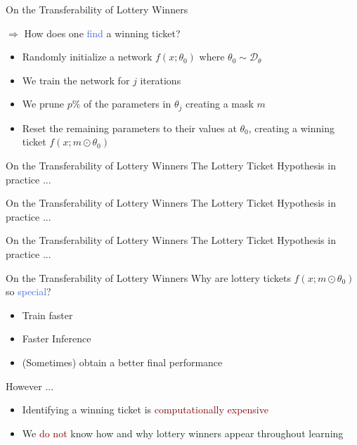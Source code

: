 \documentclass{beamer}
\begin{document}
\begin{frame}{On the Transferability of Lottery Winners}

	$\Rightarrow$ How does one \textcolor{RoyalBlue}{find} a winning ticket?
	
	\begin{itemize}
		\item Randomly initialize a network $f(x;\theta_0)$ where $\theta_0 \sim \mathcal{D}_{\theta}$
		\item We train the network for $j$ iterations
		\item We prune $p\%$ of the parameters in $\theta_j$ creating a mask $m$
		\item Reset the remaining parameters to their values at $\theta_0$, creating a winning ticket $f(x;m \odot \theta_0)$
	\end{itemize}

\end{frame}


\begin{frame}{On the Transferability of Lottery Winners}
	The Lottery Ticket Hypothesis in practice ...

	
\end{frame}

\begin{frame}{On the Transferability of Lottery Winners}
	The Lottery Ticket Hypothesis in practice ...

	
\end{frame}



\begin{frame}{On the Transferability of Lottery Winners}
	The Lottery Ticket Hypothesis in practice ...

	
\end{frame}

\begin{frame}{On the Transferability of Lottery Winners}
	Why are lottery tickets $f(x;m \odot \theta_0)$ so \textcolor{RoyalBlue}{special}?
	\begin{itemize}
		\item Train faster
		\item Faster Inference
		\item (Sometimes) obtain a better final performance
	\end{itemize}

	However ... 

	\begin{itemize}
		\item Identifying a winning ticket is \textcolor{Maroon}{computationally expensive} 
		\item We \textcolor{Maroon}{do not} know how and why lottery winners appear throughout learning
	\end{itemize}
\end{frame}
\end{document}
